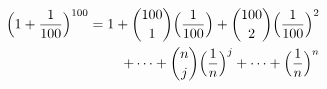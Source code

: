 \documentclass[preview]{standalone}
\begin{document}
\begin{align*}
\Big( 1 + {1 \over 100}\Big)^{100} = 1 + {100 \choose 1} \Big( {1 \over 100} \Big) + {100 \choose 2} \Big( {1 \over 100} \Big)^2 \\ + \cdots + {n \choose j} \Big( {1 \over n} \Big)^j + \cdots + \Big( {1 \over n} \Big)^n
\end{align*}
\end{document}
